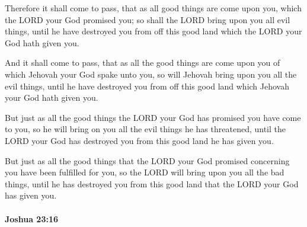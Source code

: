 			Therefore it shall come to pass, that as all good things are come upon you, which the LORD your God promised you; so shall the LORD bring upon you all evil things, until he have destroyed you from off this good land which the LORD your God hath given you.

			\begin{versebox}
					\item[BHS] 
					\item[ASV] And it shall come to pass, that as all the good things are come upon you of which Jehovah your God spake unto you, so will Jehovah bring upon you all the evil things, until he have destroyed you from off this good land which Jehovah your God hath given you.
					\item[NIV] But just as all the good things the LORD your God has promised you have come to you, so he will bring on you all the evil things he has threatened, until the LORD your God has destroyed you from this good land he has given you.
					\item[NRSV] But just as all the good things that the LORD your God promised concerning you have been fulfilled for you, so the LORD will bring upon you all the bad things, until he has destroyed you from this good land that the LORD your God has given you.
			\end{versebox}

		\paragraph{Joshua 23:16} %
			\label{JOSHUA-23-16}

